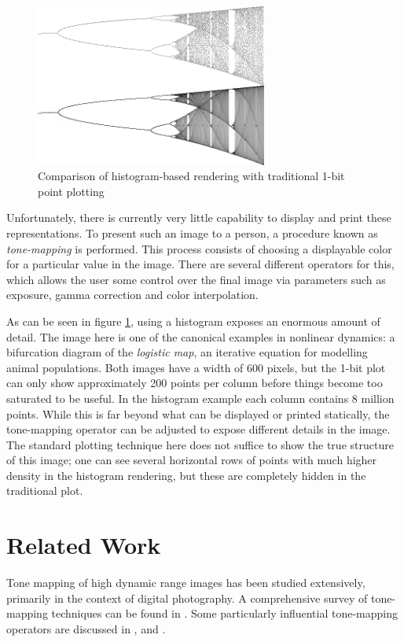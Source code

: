 \documentclass[letterpaper, 11pt]{article}
\begin{document}
\begin{figure}[htb]
\centering
\includegraphics[width=3in]{logistic-combined.png}
\caption{Comparison of histogram-based rendering with traditional 1-bit point plotting\label{logistic}}
\end{figure}

Unfortunately, there is currently very little capability to display and print these
representations.  To present such an image to a person, a procedure known as
\emph{tone-mapping} is performed.  This process consists of choosing a displayable color for
a particular value in the image.  There are several different operators for this, which
allows the user some control over the final image via parameters such as exposure, gamma
correction and color interpolation.

As can be seen in figure \ref{logistic}, using a histogram exposes an enormous amount of
detail.  The image here is one of the canonical examples in nonlinear dynamics: a bifurcation
diagram of the \emph{logistic map}, an iterative equation for modelling animal populations.
Both images have a width of 600 pixels, but the 1-bit plot can only show approximately 200
points per column before things become too saturated to be useful.  In the histogram example
each column contains 8 million points.  While this is far beyond what can be displayed or
printed statically, the tone-mapping operator can be adjusted to expose different details
in the image.  The standard plotting technique here does not suffice to show the true structure
of this image;  one can see several horizontal rows of points with much higher density in
the histogram rendering, but these are completely hidden in the traditional plot.

\section{Related Work}
Tone mapping of high dynamic range images has been studied extensively, primarily in the
context of digital photography.  A comprehensive survey of tone-mapping techniques can be
found in \cite{kd}.  Some particularly influential tone-mapping operators are discussed
in \cite{jt}, \cite{jtjhbg} and \cite{gw}.
\end{document}
